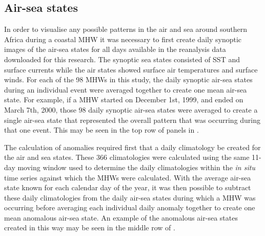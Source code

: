 \documentclass[a4paper,10pt,review]{elsarticle}
\begin{document}
\subsection{Air-sea states}
In order to visualise any possible patterns in the air and sea around southern Africa during a coastal MHW it was necessary to first create daily synoptic images of the air-sea states for all days available in the reanalysis data downloaded for this research. The synoptic sea states consisted of SST and surface currents while the air states showed surface air temperatures and surface winds. For each of the 98 MHWs in this study, the daily synoptic air-sea states during an individual event were averaged together to create one mean air-sea state. For example, if a MHW started on December 1st, 1999, and ended on March 7th, 2000, those 98 daily synoptic air-sea states were averaged to create a single air-sea state that represented the overall pattern that was occurring during that one event. This may be seen in the top row of panels in .

The calculation of anomalies required first that a daily climatology be created for the air and sea states. These 366 climatologies were calculated using the same 11-day moving window used to determine the daily climatologies within the \emph{in situ} time series against which the MHWs were calculated. With the average air-sea state known for each calendar day of the year, it was then possible to subtract these daily climatologies from the daily air-sea states during which a MHW was occurring before averaging each individual daily anomaly together to create one mean anomalous air-sea state. An example of the anomalous air-sea states created in this way may be seen in the middle row of .
\end{document}

